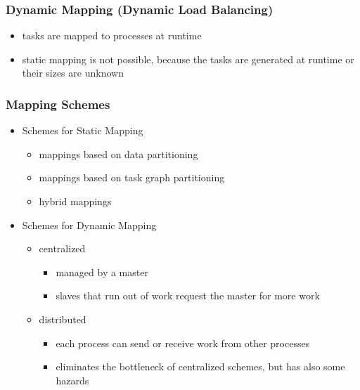 \hypertarget{dynamic-mapping-dynamic-load-balancing}{%
\subsubsection{Dynamic Mapping (Dynamic Load
Balancing)}\label{dynamic-mapping-dynamic-load-balancing}}

\begin{itemize}
\tightlist
\item
  tasks are mapped to processes at runtime
\item
  static mapping is not possible, because the tasks are generated at
  runtime or their sizes are unknown
\end{itemize}

\hypertarget{mapping-schemes}{%
\subsubsection{Mapping Schemes}\label{mapping-schemes}}

\begin{itemize}
\tightlist
\item
  Schemes for Static Mapping

  \begin{itemize}
  \tightlist
  \item
    mappings based on data partitioning
  \item
    mappings based on task graph partitioning
  \item
    hybrid mappings
  \end{itemize}
\item
  Schemes for Dynamic Mapping

  \begin{itemize}
  \tightlist
  \item
    centralized

    \begin{itemize}
    \tightlist
    \item
      managed by a master
    \item
      slaves that run out of work request the master for more work
    \end{itemize}
  \item
    distributed

    \begin{itemize}
    \tightlist
    \item
      each process can send or receive work from other processes
    \item
      eliminates the bottleneck of centralized schemes, but has also
      some hazards
    \end{itemize}
  \end{itemize}
\end{itemize}

